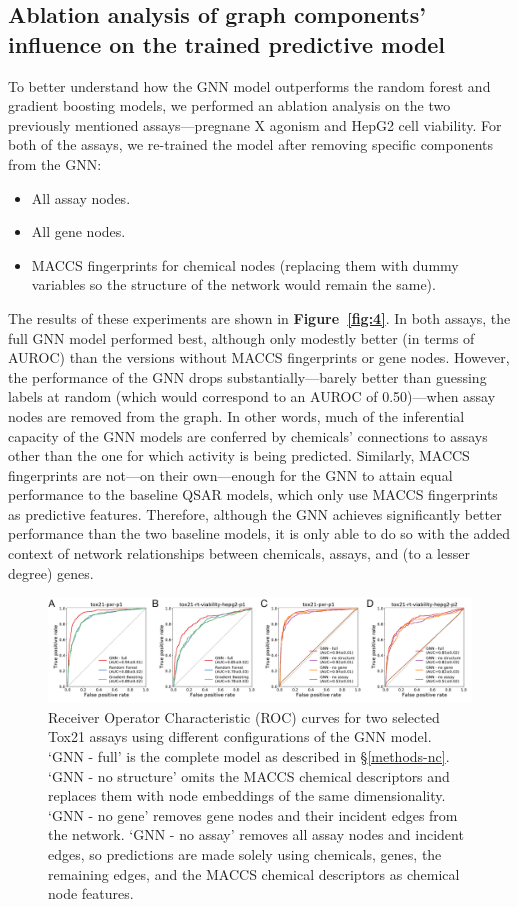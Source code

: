 \documentclass{ws-procs11x85}
\begin{document}
\subsection{Ablation analysis of graph components' influence on the trained predictive model}
To better understand how the GNN model outperforms the random forest and gradient boosting models, we performed an ablation analysis on the two previously mentioned assays---pregnane X agonism and HepG2 cell viability.
For both of the assays, we re-trained the model after removing specific components from the GNN:
\begin{itemize}
   \item All assay nodes.
   \item All gene nodes.
   \item MACCS fingerprints for chemical nodes (replacing them with dummy variables so the structure of the network would remain the same).
\end{itemize}
The results of these experiments are shown in \textbf{Figure~\ref{fig:4}}.
In both assays, the full GNN model performed best, although only modestly better (in terms of AUROC) than the versions without MACCS fingerprints or gene nodes.
However, the performance of the GNN drops substantially---barely better than guessing labels at random (which would correspond to an AUROC of 0.50)---when assay nodes are removed from the graph.
In other words, much of the inferential capacity of the GNN models are conferred by chemicals' connections to assays other than the one for which activity is being predicted.
Similarly, MACCS fingerprints are not---on their own---enough for the GNN to attain equal performance to the baseline QSAR models, which only use MACCS fingerprints as predictive features.
Therefore, although the GNN achieves significantly better performance than the two baseline models, it is only able to do so with the added context of network relationships between chemicals, assays, and (to a lesser degree) genes.

\begin{figure}
   \centering
   \includegraphics[width=\textwidth]{figures/figure3.pdf}
   \caption{Receiver Operator Characteristic (ROC) curves for two selected Tox21 assays using different configurations of the GNN model. `GNN - full' is the complete model as described in \S\ref{methods-nc}. `GNN - no structure' omits the MACCS chemical descriptors and replaces them with node embeddings of the same dimensionality. `GNN - no gene' removes gene nodes and their incident edges from the network. `GNN - no assay' removes all assay nodes and incident edges, so predictions are made solely using chemicals, genes, the remaining edges, and the MACCS chemical descriptors as chemical node features.}\label{fig:5}
\end{figure}
\end{document}
